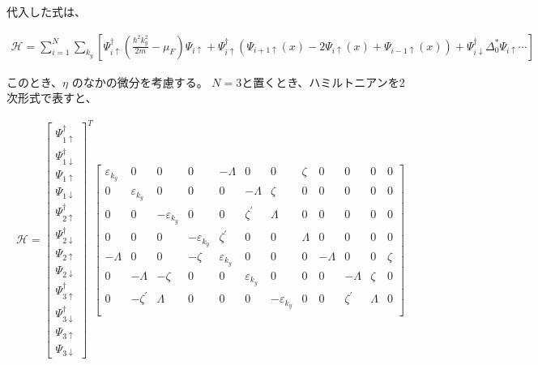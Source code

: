 \documentclass{jsarticle}
\begin{document}
		代入した式は、

		\begin{align}
			\mathcal{H}= \sum_{i=1}^N \sum_{k_y}
			\left[ \Psi^\dagger_{i\uparrow} \left( \frac{\hbar^2k_y^2}{2m}-\mu_F \right)\Psi_{i\uparrow}
			+\Psi^\dagger_{i\uparrow} \left( \Psi_{i+1\uparrow}\left(x\right)-2\Psi_{i\uparrow}\left(x\right)+\Psi_{i-1\uparrow}\left(x\right)
			\right)+\Psi^\dagger_{i\downarrow} \Delta_0^\ast \Psi_{i\uparrow} \cdots
			\right]
			\label{hamil3}
		\end{align}

		このとき、$\eta$ のなかの微分を考慮する。
		$N=3$と置くとき、ハミルトニアンを2次形式で表すと、

		\begin{align}
			\mathcal{H}=
			\begin{bmatrix}
				\Psi_{1\uparrow}^\dagger \\
				\Psi_{1\downarrow}^\dagger \\
				\Psi_{1\uparrow} \\
				\Psi_{1\downarrow} \\
				\Psi_{2\uparrow}^\dagger \\
				\Psi_{2\downarrow}^\dagger \\
				\Psi_{2\uparrow} \\
				\Psi_{2\downarrow} \\
				\Psi_{3\uparrow}^\dagger \\
				\Psi_{3\downarrow}^\dagger \\
				\Psi_{3\uparrow} \\
				\Psi_{3\downarrow}
			\end{bmatrix}
			^T
			\begin{bmatrix}
				\varepsilon_{k_y} & 0 & 0 & 0 & -\varLambda & 0 & 0 & \zeta & 0 & 0 & 0 & 0 \\
				0 & \varepsilon_{k_y} & 0 & 0 & 0 & -\varLambda & \zeta & 0 & 0 & 0 & 0 & 0 \\
				0 & 0 & -\varepsilon_{k_y} & 0 & 0 & \zeta^{'} & \varLambda & 0 & 0 & 0 & 0 & 0 \\
				0 & 0 & 0 & -\varepsilon_{k_y} & \zeta^{'} & 0 & 0 & \varLambda & 0 & 0 & 0 & 0 \\
				-\varLambda & 0 & 0 & -\zeta & \varepsilon_{k_y} & 0 & 0 & 0 & -\varLambda & 0 & 0 & \zeta \\
				0 & -\varLambda & -\zeta & 0 & 0 & \varepsilon_{k_y} & 0 & 0 & 0 & -\varLambda & \zeta & 0 \\
				0 & -\zeta^{'} & \varLambda & 0 & 0 & 0 & -\varepsilon_{k_y} & 0 & 0 & \zeta^{'} & \varLambda & 0 \\

\end{bmatrix}
\end{align}
\end{document}
